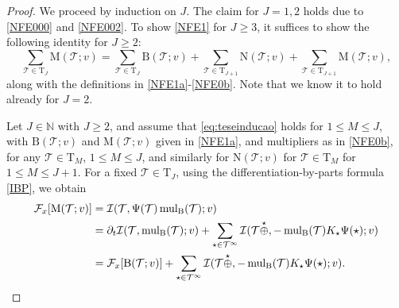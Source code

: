 \documentclass[%
11pt,  reqno]{amsart}
\makeatletter
\newcommand{\5}{\textup{V}}
\newcommand{\dt}{\partial_t}
\theoremstyle{remark}
\newcommand{\TT}{\mathcal{T}}
\newcommand{\Tr}{\mathrm{T}}
\newcommand{\Ft}{{\mathcal{F}}}
\newcommand{\N}{\mathbb{N}}
\DeclareMathOperator{\mulB}{mul_{\BB}}
\def\<#1>{\csname MH@symb@#1\endcsname}
\newcommand{\Ical}{\mathcal{I}}
\numberwithin{equation}{section}
\numberwithin{theorem}{section}
\newcommand{\MM}{\mathrm{M}}
\newcommand{\NN}{\mathrm{N}}
\newcommand{\BB}{\mathrm{B}}
\makeatother
\begin{document}
\begin{proof}



We proceed by induction on $J$. 
The claim for $J=1,2$ holds due to \eqref{NFE000} and \eqref{NFE002}.
To show \eqref{NFE1} for $J\ge3$, it suffices to show the following identity for $J\ge 2$:
\begin{equation}\label{eq:teseinducao}
\sum_{\TT\in\Tr_{J}} \MM(\TT; v) 
= 
\sum_{\TT\in \Tr_{J}} \BB(\TT; v) 
+
\sum_{\TT\in \Tr_{J+1}} \NN(\TT; v) 
+ \sum_{\TT\in \Tr_{J+1}} \MM(\TT; v),
\end{equation}
along with the definitions in \eqref{NFE1a}-\eqref{NFE0b}. Note that we know it to hold already for $J=2$. 


Let $J\in \N$ with $J\ge2$, and assume that \eqref{eq:teseinducao} holds for $1\le M \le J$, 
with $\BB(\TT; v)$ and $\MM(\TT; v)$ given in \eqref{NFE1a}, and multipliers as in \eqref{NFE0b}, for any $\TT\in \Tr_M$, $1\le M \le J$, and similarly for $\NN(\TT; v)$ for $\TT\in \Tr_M$ for $1\le M \le J+1$.
For a fixed $\TT\in\Tr_{J}$, using the differentiation-by-parts formula \eqref{IBP}, we obtain
\begin{align*}
\Ft_x [\MM(\TT; v) ]
&
=\Ical(\TT, \Psi(\TT)\mulB(\TT); v)
\\
& =
\dt\Ical(\TT,\mulB(\TT); v) +
\sum_{\star\in\TT^\infty}
\Ical (\TT \overset{\star}{\oplus} \<1>, -\mulB(\TT) K_\star \Psi(\star) ; v )
\\
&
= \Ft_x[\BB(\TT; v) ]  
+
\sum_{\star\in\TT^\infty} \Ical (\TT \overset{\star}{\oplus} \<1>, -\mulB(\TT) K_\star \Psi(\star) ; v).
\end{align*}




\end{proof}
\end{document}

